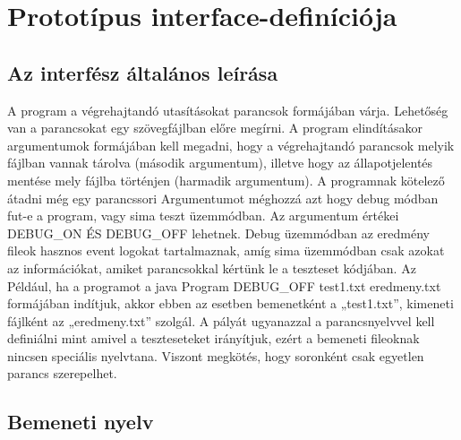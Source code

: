 \thispagestyle{fancy}

\section{Prototípus interface-definíciója}

\subsection{Az interfész általános leírása}

A program a végrehajtandó utasításokat parancsok formájában várja. Lehetőség van a parancsokat egy
szövegfájlban előre megírni. A program elindításakor argumentumok formájában kell megadni, hogy a
végrehajtandó parancsok melyik fájlban vannak tárolva (második argumentum), illetve hogy az állapotjelentés
mentése mely fájlba történjen (harmadik argumentum).
A programnak kötelező átadni még egy parancssori Argumentumot méghozzá azt hogy debug módban fut-e a program, vagy sima teszt üzemmódban. Az argumentum értékei DEBUG\_ON ÉS DEBUG\_OFF lehetnek. Debug üzemmódban az eredmény fileok hasznos event logokat tartalmaznak, amíg sima üzemmódban csak azokat az információkat, amiket parancsokkal kértünk le a teszteset kódjában.
Az Például, ha a programot a java Program DEBUG\_OFF test1.txt
eredmeny.txt formájában indítjuk, akkor ebben az esetben bemenetként a „test1.txt”, kimeneti fájlként az
„eredmeny.txt” szolgál. A pályát ugyanazzal a parancsnyelvvel kell definiálni mint amivel a teszteseteket irányítjuk, ezért a bemeneti fileoknak nincsen speciális nyelvtana. Viszont megkötés, hogy soronként csak egyetlen parancs szerepelhet.

\subsection{Bemeneti nyelv}

